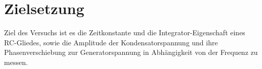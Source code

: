 
\section{Zielsetzung}
\label{sec:Zielsetzung}

Ziel des Versuchs ist es die Zeitkonstante und die Integrator-Eigenschaft eines RC-Gliedes, sowie die Amplitude der Kondensatorspannung und ihre Phasenverschiebung zur Generatorspannung in Abhängigkeit von der Frequenz zu messen.

